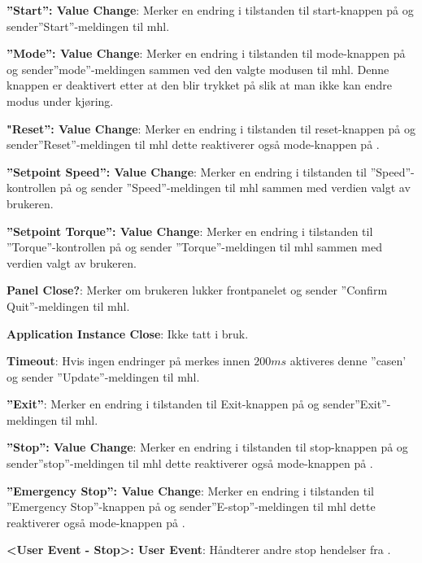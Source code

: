 \documentclass{ol-softwaremanual}
\begin{document}
\begin{enumerate}[label={[\arabic*]}]
  \item \textbf{''Start'': Value Change}: Merker en endring i tilstanden til start-knappen på  og sender''Start''-meldingen til \acrshort{mhl}.
  \item \textbf{''Mode'': Value Change}: Merker en endring i tilstanden til mode-knappen på  og sender''mode''-meldingen sammen ved den valgte modusen til \acrshort{mhl}. Denne knappen er deaktivert etter at den blir trykket på slik at man ikke kan endre modus under kjøring.
  \item \textbf{"Reset'': Value Change}: Merker en endring i tilstanden til reset-knappen på  og sender''Reset''-meldingen til \acrshort{mhl} dette reaktiverer også mode-knappen på .
  \item \textbf{''Setpoint Speed'': Value Change}: Merker en endring i tilstanden til ''Speed''-kontrollen på  og sender ''Speed''-meldingen til \acrshort{mhl} sammen med verdien valgt av brukeren. 
  \item \textbf{''Setpoint Torque'': Value Change}:  Merker en endring i tilstanden til ''Torque''-kontrollen på  og sender ''Torque''-meldingen til \acrshort{mhl} sammen med verdien valgt av brukeren. 
  \item \textbf{Panel Close?}: Merker om brukeren lukker frontpanelet og sender ''Confirm Quit''-meldingen til \acrshort{mhl}.
  \item \textbf{Application Instance Close}: Ikke tatt i bruk.
  \item \textbf{Timeout}: Hvis ingen endringer på  merkes innen $200ms$ aktiveres denne ''casen' og sender ''Update''-meldingen til \acrshort{mhl}.
  \item \textbf{''Exit''}: Merker en endring i tilstanden til Exit-knappen på  og sender''Exit''-meldingen til \acrshort{mhl}.
 \item \textbf{''Stop'': Value Change}: Merker en endring i tilstanden til stop-knappen på  og sender''stop''-meldingen til \acrshort{mhl} dette reaktiverer også mode-knappen på .
 \item \textbf{''Emergency Stop'': Value Change}: Merker en endring i tilstanden til ''Emergency Stop''-knappen på  og sender''E-stop''-meldingen til \acrshort{mhl} dette reaktiverer også mode-knappen på .
 \item \textbf{<User Event - Stop>: User Event}: Håndterer andre stop hendelser fra .
\end{enumerate}
\end{document}
